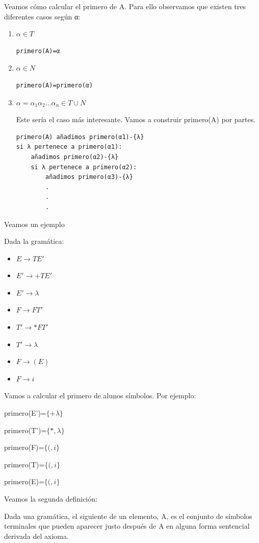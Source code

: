 \documentclass{apuntes}
\begin{document}
Veamos cómo calcular el primero de A. Para ello observamos que existen tres diferentes casos según α:
\begin{enumerate}
\item $α \in T$
\begin{verbatim}
primero(A)=α
\end{verbatim}

\item $α \in N$
\begin{verbatim}
primero(A)=primero(α)
\end{verbatim}
\item $α = α_1α_2...α_n \in T \cup N$

Este sería el caso más interesante. Vamos a construir primero(A) por partes.
\begin{verbatim}
primero(A) añadimos primero(α1)-{λ}
si λ pertenece a primero(α1):
    añadimos primero(α2)-{λ}
    si λ pertenece a primero(α2):
        añadimos primero(α3)-{λ}
        .
        .
        .
\end{verbatim}
\end{enumerate}

Veamos un ejemplo
\begin{example}
Dada la gramática:
\begin{itemize}
\item $E \rightarrow TE'$
\item $E' \to +TE'$
\item $E' \to λ$
\item $F \to FT'$
\item $T' \to *FT'$
\item $T' \to λ$
\item $F \to (E)$
\item $F \to i$
\end{itemize}

Vamos a calcular el primero de alunos símbolos. Por ejemplo:

primero(E')=$\{+λ\}$

primero(T')=$\{*, λ\}$

primero(F)=$\{(,i\}$

primero(T)=$\{(, i\}$

primero(E)=$\{(, i\}$
\end{example}

Veamos la segunda definición:

\begin{defn}[Siguiente]
Dada una gramática, el siguiente de un elemento, A, es el conjunto de símbolos terminales que pueden aparecer justo después de A en alguna forma sentencial derivada del axioma.
\end{defn}
\end{document}
